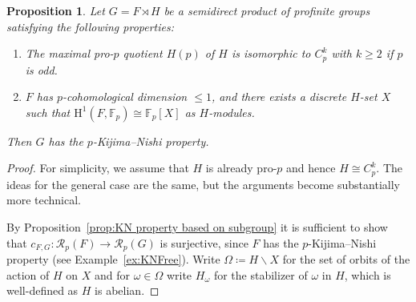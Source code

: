 \documentclass{amsart}
\newtheorem{prop}[thm]{Proposition}
\theoremstyle{definition}
\theoremstyle{remark}
\newcommand{\FF}{\mathbb{F}}
\newcommand{\calR}{\mathcal{R}}
\newcommand{\rmH}{\mathrm H}%
\begin{document}
\begin{prop}
\label{prop:free semidirect finite}
    Let $G=F\rtimes H$ be a semidirect product of profinite groups satisfying the following properties:
    \begin{enumerate}
        \item The maximal pro-$p$ quotient $H(p)$ of $H$ is isomorphic to $C_p^k$ with $k\geq 2 $ if $p$ is odd.
        \item $F$ has $p$-cohomological dimension $\leq 1$, and there exists a discrete $H$-set $X$ such that $\rmH^1(F,\FF_p)\cong \FF_p[X]$ as $H$-modules.
    \end{enumerate}
    Then $G$ has the $p$-Kijima--Nishi property.
\end{prop}
\begin{proof}
    For simplicity, we assume that $H$ is already pro-$p$ and hence $H\cong C_p^k$. The ideas for the general case are the same, but the arguments become substantially more technical.

    By Proposition~\ref{prop:KN property based on subgroup} it is sufficient to show that $c_{F,G}:\calR_p(F)\to \calR_p(G)$ is surjective, since $F$ has the $p$-Kijima--Nishi property (see Example~\ref{ex:KNFree}). Write $\Omega\coloneq H\backslash X$ for the set of orbits of the action of $H$ on $X$ and for $\omega\in \Omega$ write $H_\omega$ for the stabilizer of $\omega$ in $H$, which is well-defined as $H$ is abelian. 
    

\end{proof}
\end{document}
